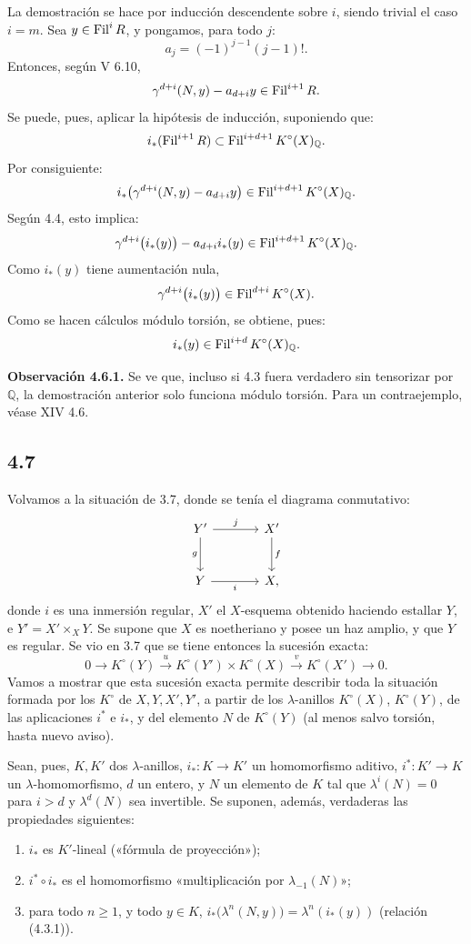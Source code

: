 La demostración se hace por inducción descendente sobre \(i\), siendo trivial el caso \(i=m\). Sea \(y\in\operatorname{Fil}^iR\), y pongamos, para todo \(j\):
\[
  a_j=(-1)^{j-1}(j-1)!.
\]
Entonces, según V 6.10,
\[
  \gamma^{d+i}(N,y)-a_{d+i}y\in\operatorname{Fil}^{i+1}R.
\]
Se puede, pues, aplicar la hipótesis de inducción, suponiendo que:
\[
  i_*(\operatorname{Fil}^{i+1}R)\subset \operatorname{Fil}^{i+d+1}K^\circ(X)_{\mathbb Q}.
\]
Por consiguiente:
\[
  i_*\bigl(\gamma^{d+i}(N,y)-a_{d+i}y\bigr)
  \in\operatorname{Fil}^{i+d+1}K^\circ(X)_{\mathbb Q}.
\]
Según 4.4, esto implica:
\[
  \gamma^{d+i}\bigl(i_*(y)\bigr)-a_{d+i}i_*(y)
  \in\operatorname{Fil}^{i+d+1}K^\circ(X)_{\mathbb Q}.
\]
Como \(i_*(y)\) tiene aumentación nula,
\[
  \gamma^{d+i}\bigl(i_*(y)\bigr)\in\operatorname{Fil}^{d+i}K^\circ(X).
\]
Como se hacen cálculos módulo torsión, se obtiene, pues:
\[
  i_*(y)\in\operatorname{Fil}^{i+d}K^\circ(X)_{\mathbb Q}.
\]

\textbf{Observación 4.6.1.} Se ve que, incluso si 4.3 fuera verdadero sin tensorizar por \(\mathbb Q\), la demostración anterior solo funciona módulo torsión. Para un contraejemplo, véase XIV 4.6.

\subsection*{4.7}

Volvamos a la situación de 3.7, donde se tenía el diagrama conmutativo:
\[
\begin{tikzcd}[column sep=large,row sep=large]
Y' \arrow[r,"j"] \arrow[d,"g"'] & X' \arrow[d,"f"]\\
Y \arrow[r,"i"'] & X,
\end{tikzcd}
\]
donde \(i\) es una inmersión regular, \(X'\) el \(X\)-esquema obtenido haciendo estallar \(Y\), e \(Y'=X'\times_XY\). Se supone que \(X\) es noetheriano y posee un haz amplio, y que \(Y\) es regular. Se vio en 3.7 que se tiene entonces la sucesión exacta:
\[
0\longrightarrow K^\circ(Y)\xrightarrow{u}
K^\circ(Y')\times K^\circ(X)\xrightarrow{v}
K^\circ(X')\longrightarrow0.
\]
Vamos a mostrar que esta sucesión exacta permite describir toda la situación formada por los \(K^\circ\) de \(X,Y,X',Y'\), a partir de los \(\lambda\)-anillos \(K^\circ(X)\), \(K^\circ(Y)\), de las aplicaciones \(i^*\) e \(i_*\), y del elemento \(N\) de \(K^\circ(Y)\) (al menos salvo torsión, hasta nuevo aviso).

Sean, pues, \(K,K'\) dos \(\lambda\)-anillos, \(i_*:K\to K'\) un homomorfismo aditivo, \(i^*:K'\to K\) un \(\lambda\)-homomorfismo, \(d\) un entero, y \(N\) un elemento de \(K\) tal que \(\lambda^i(N)=0\) para \(i>d\) y \(\lambda^d(N)\) sea invertible. Se suponen, además, verdaderas las propiedades siguientes:
\begin{enumerate}[label=\roman*)]
\item \(i_*\) es \(K'\)-lineal («fórmula de proyección»);
\item \(i^*\circ i_*\) es el homomorfismo «multiplicación por \(\lambda_{-1}(N)\)»;
\item para todo \(n\ge1\), y todo \(y\in K\), \(i_*\bigl(\lambda^n(N,y)\bigr)=\lambda^n(i_*(y))\) (relación (4.3.1)).
\end{enumerate}

